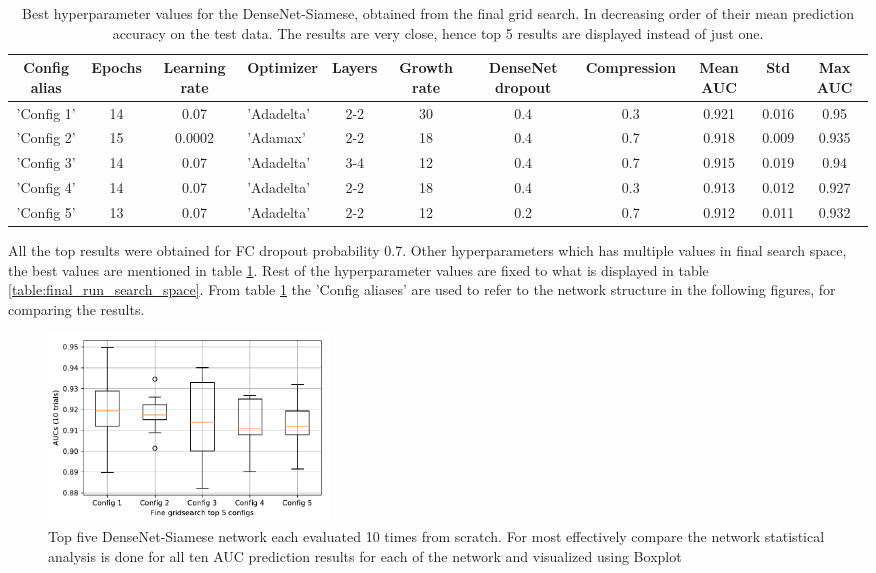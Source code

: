 \begin{table}[ht]
\centering
\caption[Best hyperparameter values for the DenseNet-Siamese ...]{Best hyperparameter values for the DenseNet-Siamese, obtained from the final grid search. In decreasing order of their mean prediction accuracy on the test data. 
The results are very close, hence top 5 results are displayed instead of just one.}
\resizebox{\textwidth}{!}
{\begin{tabular}{|c c c l c c c c c c c|} 
 \hline\hline
 \rowcolor{lightgrey}
\textbf{Config alias} & \textbf{Epochs} & \textbf{Learning rate} & \textbf{Optimizer} & \textbf{Layers} & \textbf{Growth rate} & \textbf{DenseNet dropout} & \textbf{Compression} & \textbf{Mean AUC} & \textbf{Std} & \textbf{Max AUC}\\
\hline
'Config 1' & 14 & 0.07 & 'Adadelta' & 2-2 & 30 & 0.4 & 0.3 & 0.921 & 0.016 & 0.95 \\
'Config 2' & 15 & 0.0002 & 'Adamax' & 2-2 & 18 & 0.4 & 0.7 & 0.918 & 0.009 & 0.935\\
'Config 3' & 14 & 0.07 & 'Adadelta' & 3-4 & 12 & 0.4 & 0.7 & 0.915 & 0.019 & 0.94\\
'Config 4' & 14 & 0.07 & 'Adadelta' & 2-2 & 18 & 0.4 & 0.3 & 0.913 & 0.012 & 0.927\\
'Config 5' & 13 & 0.07 & 'Adadelta' & 2-2 & 12 & 0.2 & 0.7 & 0.912 & 0.011 & 0.932\\
 \hline \hline
\end{tabular}}
\label{table:final_run_best_configs}
\end{table}

\flushbottom
\newpage
All the top results were obtained for FC dropout probability 0.7. Other hyperparameters which has multiple values in final search space, the best values are mentioned in table \ref{table:final_run_best_configs}. Rest of the hyperparameter values are fixed to what is displayed in table \ref{table:final_run_search_space}. 
From table \ref{table:final_run_best_configs} the 'Config aliases' are used to refer to the network structure in the following figures, for comparing the results.

\begin{figure}[ht]
\centering
\includegraphics[height= 5cm]{images/densenet/siamese/top_config_boxplot}
\caption[Boxplot visualization of top five DenseNet-Siamese network]{Top five DenseNet-Siamese network each evaluated 10 times from scratch. For most effectively compare the network statistical analysis is done for all ten AUC prediction results
for each of the network and visualized using Boxplot}
\label{fig:fine_grid_search_top_configs}
\end{figure}

